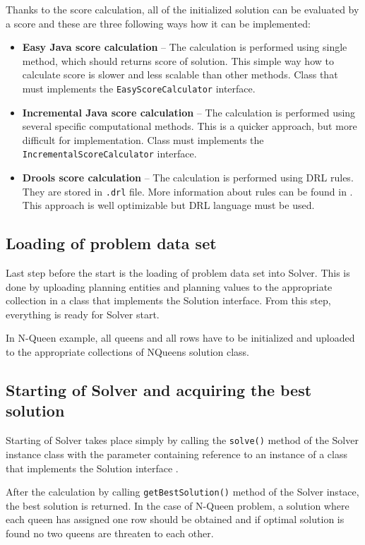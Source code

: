 Thanks to the score calculation, all of the initialized solution can be evaluated by a score and these are three following ways how it can be implemented:

\begin{itemize}
\item \textbf{Easy Java score calculation} -- The calculation is performed using single method, which should returns score of solution. This simple way how to calculate score is slower and less scalable than other methods. Class that must implements the \texttt{EasyScoreCalculator} interface.
\item \textbf{Incremental Java score calculation} -- The calculation is performed using several specific computational methods. This is a quicker approach, but more difficult for implementation. Class must implements the \texttt{IncrementalScoreCalculator} interface.
\item \textbf{Drools score calculation} -- The calculation is performed using DRL rules. They are stored in \texttt{.drl} file. More information about rules can be found in \cite{DroolsBook, Drools}. This approach is well optimizable but DRL language must be used.
\end{itemize}

\subsection{Loading of problem data set}
Last step before the start is the loading of problem data set into Solver. This is done by uploading planning entities and planning values to the appropriate collection in a class that implements the Solution interface. From this step, everything is ready for Solver start.

In N-Queen example, all queens and all rows have to be initialized and uploaded to the appropriate collections of NQueens solution class.

\subsection{Starting of Solver and acquiring the best solution}
Starting of Solver takes place simply by calling the \texttt{solve()} method of the Solver instance class with the parameter containing reference to an instance of a class that implements the Solution interface .

After the calculation by calling \texttt{getBestSolution()} method of the Solver instace, the best solution is returned. In the case of N-Queen problem, a solution where each queen has assigned one row should be obtained and if optimal solution is found no two queens are threaten to each other.

